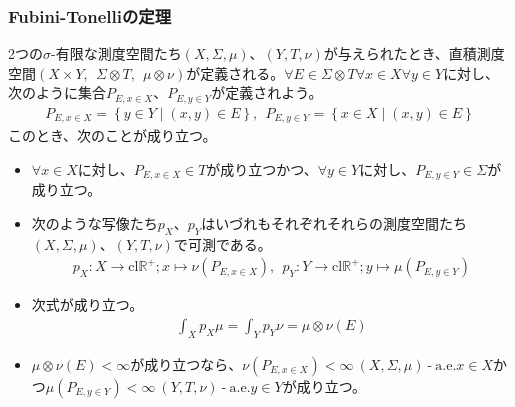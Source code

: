 \documentclass[dvipdfmx]{jsarticle}
\begin{document}
\subsubsection{Fubini-Tonelliの定理}%
\begin{thm}\label{4.6.4.2}
2つの$\sigma$-有限な測度空間たち$(X,\varSigma,\mu)$、$(Y,T,\nu)$が与えられたとき、直積測度空間$(X \times Y,\ \ \varSigma \otimes T,\ \ \mu \otimes \nu)$が定義される。$\forall E \in \varSigma \otimes T\forall x \in X\forall y \in Y$に対し、次のように集合$P_{E,x \in X}$、$P_{E,y \in Y}$が定義されよう。
\begin{align*}
P_{E,x \in X} = \left\{ y \in Y \middle| (x,y) \in E \right\},\ \ P_{E,y \in Y} = \left\{ x \in X \middle| (x,y) \in E \right\}
\end{align*}
このとき、次のことが成り立つ。
\begin{itemize}
\item
  $\forall x \in X$に対し、$P_{E,x \in X} \in T$が成り立つかつ、$\forall y \in Y$に対し、$P_{E,y \in Y} \in \varSigma$が成り立つ。
\item
  次のような写像たち$p_{X}$、$p_{Y}$はいづれもそれぞれそれらの測度空間たち$(X,\varSigma,\mu)$、$(Y,T,\nu)$で可測である。
\begin{align*}
p_{X}:X \rightarrow \mathrm{cl}\mathbb{R}^{+};x \mapsto \nu\left( P_{E,x \in X} \right),\ \ p_{Y}:Y \rightarrow \mathrm{cl}\mathbb{R}^{+};y \mapsto \mu\left( P_{E,y \in Y} \right)
\end{align*}
\item
  次式が成り立つ。
\begin{align*}
\int_{X} {p_{X}\mu} = \int_{Y} {p_{Y}\nu} = \mu \otimes \nu(E)
\end{align*}
\item
  $\mu \otimes \nu(E) < \infty$が成り立つなら、$\nu\left( P_{E,x \in X} \right) < \infty\ (X,\varSigma,\mu) \ \text{-} \ \mathrm{a.e.}x \in X$かつ$\mu\left( P_{E,y \in Y} \right) < \infty\ (Y,T,\nu) \ \text{-} \ \mathrm{a.e.}y \in Y$が成り立つ。
\end{itemize}
\end{thm}
\end{document}
